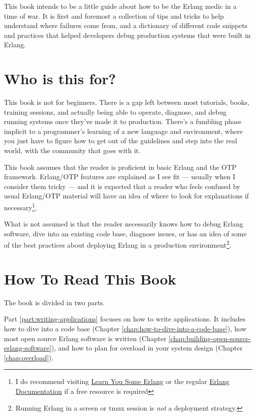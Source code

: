 \documentclass[11pt, oneside]{book}   	%
\begin{document}
This book intends to be a little guide about how to be the Erlang medic in a time of war. It is first and foremost a collection of tips and tricks to help understand where failures come from, and a dictionary of different code snippets and practices that helped developers debug production systems that were built in Erlang.

\section{Who is this for?}
\label{sec:who-is-this-for}

This book is not for beginners. There is a gap left between most tutorials, books, training sessions, and actually being able to operate, diagnose, and debug running systems once they've made it to production. There's a fumbling phase implicit to a programmer's learning of a new language and environment, where you just have to figure how to get out of the guidelines and step into the real world, with the community that goes with it.

This book assumes that the reader is proficient in basic Erlang and the OTP framework. Erlang/OTP features are explained as I see fit — usually when I consider them tricky — and it is expected that a reader who feels confused by usual Erlang/OTP material will have an idea of where to look for explanations if necessary\footnote{I do recommend visiting \href{http://learnyousomeerlang.com}{Learn You Some Erlang} or the regular \href{http://www.erlang.org/erldoc}{Erlang Documentation} if a free resource is required}.

What is not assumed is that the reader necessarily knows how to debug Erlang software, dive into an existing code base, diagnose issues, or has an idea of some of the best practices about deploying Erlang in a production environment\footnote{Running Erlang in a screen or tmux session is \emph{not} a deployment strategy.}.

\section{How To Read This Book}
\label{sec:how-to-read-this-book}

The book is divided in two parts. 

Part \ref{part:writing-applications} focuses on how to write applications. It includes how to dive into a code base (Chapter \ref{chap:how-to-dive-into-a-code-base}), how most open source Erlang software is written (Chapter \ref{chap:building-open-source-erlang-software}), and how to plan for overload in your system design (Chapter \ref{chap:overload}).
\end{document}
